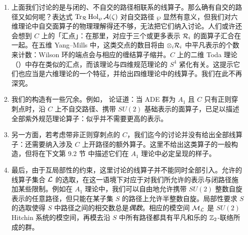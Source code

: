 \begin{enumerate}

\item 上面我们讨论的是与闭的、不自交的路径相联系的线算子。那么确有自交的路径又如何呢？表达式 $\operatorname{Tr}_{\mathcal{R}} \operatorname{Hol}_\wp\mathcal{A}(\zeta)$ 对自交路径 $\wp$ 显然有意义，但我们对六维理论中自交面算子的物理理解得还不够，无法把它们纳入讨论。人们或许还会想到 $C$ 上的「汇点」：在那里，对应于三个或更多表示 $\mathcal{R}_i$ 的面算子汇合在一起。在五维 Yang--Mills 中，这类交点的数目将由 $\otimes_i\mathcal{R}_i$ 中平凡表示的个数来计数：Wilson 环的端点会与相应的缠结算子缩并。$C$ 上的二维 Toda 理论（\cite{Drukker:2010jp}）中存在类似的汇点，而该理论与四维规范理论的 $S^4$ 紧化有关。这提示它们也应当是六维理论的一个特征，并给出四维理论中的线算子。我们在此不再深究。

\item 我们的构造有一些冗余。例如，\cite{Drukker:2009id} 论证道：当 ADE 群为 $A_1$ 且 $C$ 只有正则穿刺点时，沿 $C$ 上不自交路径、携带 $SU(2)$ 基础表示的面算子，已足以描述全部紫外规范理论算子：似乎并不需要更高的表示。

\item 另一方面，若考虑带非正则穿刺点的 $C$，我们迄今的讨论并没有给出全部线算子：还需要纳入涉及 $C$ 上开路径的额外算子。这里不给出这类算子的一般构造，但将在下文第 9.2 节%
中描述它们在 $A_1$ 理论中必定呈现的样子。

\item 最后，由于互局部性的约束，这里讨论的线算子并不能同时全部引入。允许的线算子集合 $\mathcal{L}$ 的选取，在这一语境下对应于对我们所允许的表示与闭路径施加某些限制。例如在 $A_1$ 理论中，我们可以自由地允许携带 $SU(2)$ 整数自旋表示的任意路径，但只能在某子集 $S$ 的路径上允许半整数自旋。局部性要求 $S$ 的选取使得 $S$ 中路径之间的相交数总是\emph{偶数}。相应的模空间 $\mathcal{M}_{\mathcal{L}}$ 是 $SU(2)$ Hitchin 系统的模空间，再模去沿 $S$ 中所有路径都具有平凡和乐的 $\mathbb{Z}_2$-联络所成的群。

\end{enumerate}
